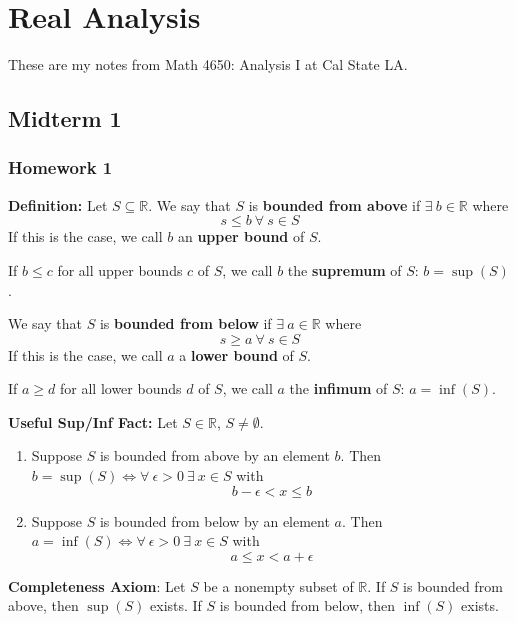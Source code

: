 \section{Real Analysis}

These are my notes from Math 4650: Analysis I at Cal State LA.


\subsection{Midterm 1}

\subsubsection{Homework 1}

\textbf{Definition:} Let \(S \subseteq \mathbb{R}\). We say that \(S\) is \textbf{bounded from above} if \(\exists \ b \in \mathbb{R}\) where \[s \leq b \ \forall \ s \in S\]If this is the case, we call \(b\) an \textbf{upper bound} of \(S\).

If \(b \leq c \) for all upper bounds \(c\) of \(S\), we call \(b\) the \textbf{supremum} of \(S\): \(b = \sup(S)\).

We say that \(S\) is \textbf{bounded from below} if \(\exists \ a \in \mathbb{R}\) where \[s \geq a \ \forall \ s \in S\]If this is the case, we call \(a\) a \textbf{lower bound} of \(S\).

If \(a \geq d \) for all lower bounds \(d\) of \(S\), we call \(a\) the \textbf{infimum} of \(S\): \(a = \inf(S)\).

\textbf{Useful Sup/Inf Fact:} Let \(S \in \mathbb{R}\), \(S \neq \emptyset\). 

\begin{enumerate}[(1)]

\item Suppose \(S\) is bounded from above by an element \(b\). Then \(b = \sup(S) \iff \forall \ \epsilon >0 \ \exists \ x \in S\) with \[b - \epsilon < x \leq b\]

\item Suppose \(S\) is bounded from below by an element \(a\). Then \(a = \inf(S) \iff \forall \ \epsilon >0 \ \exists \ x \in S\) with \[a \leq x < a + \epsilon\]

\end{enumerate}

\textbf{Completeness Axiom}: Let \(S\) be a nonempty subset of \(\mathbb{R}\). If \(S\) is bounded from above, then \(\sup(S)\) exists. If \(S\) is bounded from below, then \(\inf(S)\) exists.

